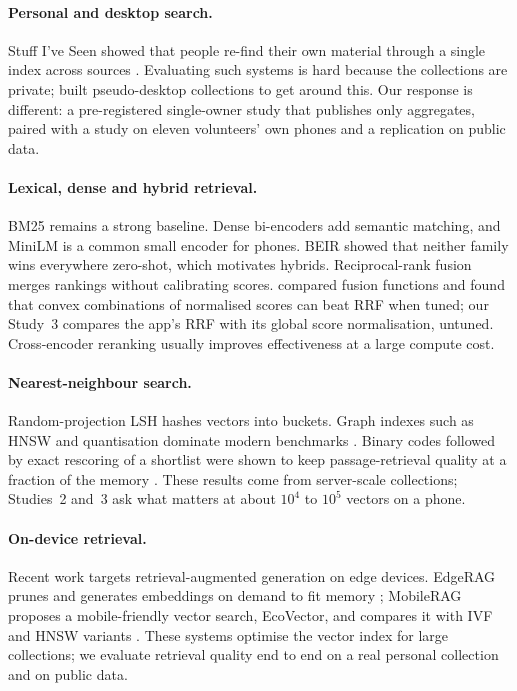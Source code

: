 \documentclass[11pt,a4paper]{article}
\begin{document}
\paragraph{Personal and desktop search.} Stuff I've Seen showed that people re-find their own material through a single index across sources \citep{dumais2003sis}. Evaluating such systems is hard because the collections are private; \citet{kim2009pseudodesktop} built pseudo-desktop collections to get around this. Our response is different: a pre-registered single-owner study that publishes only aggregates, paired with a study on eleven volunteers' own phones and a replication on public data.

\paragraph{Lexical, dense and hybrid retrieval.} BM25 \citep{robertson2009bm25} remains a strong baseline. Dense bi-encoders \citep{reimers2019sbert,karpukhin2020dpr} add semantic matching, and MiniLM \citep{wang2020minilm} is a common small encoder for phones. BEIR \citep{thakur2021beir} showed that neither family wins everywhere zero-shot, which motivates hybrids. Reciprocal-rank fusion \citep{cormack2009rrf} merges rankings without calibrating scores. \citet{bruch2023fusion} compared fusion functions and found that convex combinations of normalised scores can beat RRF when tuned; our Study~3 compares the app's RRF with its global score normalisation, untuned. Cross-encoder reranking \citep{nogueira2019bert} usually improves effectiveness at a large compute cost.

\paragraph{Nearest-neighbour search.} Random-projection LSH \citep{indyk1998lsh,charikar2002simhash} hashes vectors into buckets. Graph indexes such as HNSW \citep{malkov2020hnsw} and quantisation \citep{jegou2011pq} dominate modern benchmarks \citep{aumuller2020ann,johnson2021faiss}. Binary codes followed by exact rescoring of a shortlist were shown to keep passage-retrieval quality at a fraction of the memory \citep{yamada2021bpr}. These results come from server-scale collections; Studies~2 and~3 ask what matters at about $10^4$ to $10^5$ vectors on a phone.

\paragraph{On-device retrieval.} Recent work targets retrieval-augmented generation on edge devices. EdgeRAG prunes and generates embeddings on demand to fit memory \citep{seemakhupt2024edgerag}; MobileRAG proposes a mobile-friendly vector search, EcoVector, and compares it with IVF and HNSW variants \citep{park2025mobilerag}. These systems optimise the vector index for large collections; we evaluate retrieval quality end to end on a real personal collection and on public data.
\end{document}
